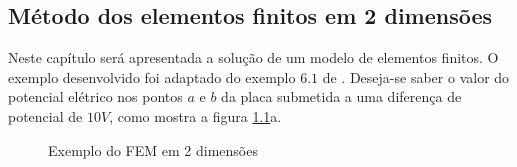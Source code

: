 \documentclass[
    12pt,               %
    openright,          %
    oneside,
    a4paper,            %
    english,            %
    french,             %
    spanish,            %
    brazil              %
    ]{abntex2}
\begin{document}
\begin{apendicesenv}



\chapter{Método dos elementos finitos em 2 dimensões}
\label{sec:fem2d}
Neste capítulo será apresentada a solução de um modelo de elementos finitos. O exemplo desenvolvido foi adaptado do exemplo $6.1$ de . Deseja-se saber o valor do potencial elétrico nos pontos $a$ e $b$ da placa submetida a uma diferença de potencial de $10V$, como mostra a figura \ref{fig:exemplo}{a}.

\begin{figure}%
	\centering
	\qquad
	\caption{Exemplo do FEM em 2 dimensões}%
	\label{fig:exemplo}%
\end{figure}


\end{apendicesenv}
\end{document}
